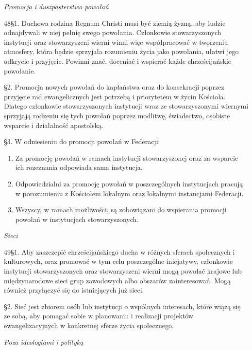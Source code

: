 ﻿\documentclass{book}
\newcommand{\lett}[1]{\lettrine[findent=6pt]{#1}}
\newcommand{\ssec}[1]{\vspace{1em}\textit{#1}\vspace{.5em}\nopagebreak}
\begin{document}
\ssec{Promocja i duszpasterstwo powołań}
 
\lett{48} \S{}1. Duchowa rodzina Regnum Christi musi być ziemią żyzną, aby ludzie odnajdywali w niej pełnię swego powołania. Członkowie stowarzyszonych instytucji oraz stowarzyszeni wierni winni więc współpracować w tworzeniu atmosfery, która będzie sprzyjała rozumieniu życia jako powołania, ułatwi jego odkrycie i przyjęcie. Powinni  znać, doceniać i wspierać każde chrześcijańskie powołanie.


\S{}2. Promocja nowych powołań do kapłaństwa oraz do konsekracji poprzez przyjęcie rad ewangelicznych jest potrzebą i priorytetem w życiu Kościoła. Dlatego członkowie stowarzyszonych instytucji wraz ze stowarzyszonymi wiernymi sprzyjają rodzeniu się tych powołań poprzez modlitwę, świadectwo, osobiste wsparcie i działalność apostolską.


\S{}3. W odniesieniu do promocji powołań w Federacji:


\begin{enumerate}


\item Za promocję powołań w ramach instytucji stowarzyszonej oraz za wsparcie ich rozeznania odpowiada sama instytucja.


\item Odpowiedzialni za promocję powołań w poszczególnych instytucjach pracują w porozumieniu z Kościołem lokalnym oraz lokalnymi instancjami Federacji.


\item Wszyscy, w ramach możliwości, są zobowiązani do wspierania promocji powołań w instytucjach stowarzyszonych.


\end{enumerate}


 
\ssec{Sieci}
 
\lett{49} \S{}1. Aby zaszczepić chrześcijańskiego ducha w różnych sferach społecznych i kulturowych, oraz promować w tym celu poszczególne inicjatywy, członkowie instytucji stowarzyszonych oraz stowarzyszeni wierni mogą powołać krajowe lub międzynarodowe sieci grup zawodowych albo obszarów zainteresowań. Mogą również przyłączyć się do istniejących już sieci.


\S{}2. Sieć jest zbiorem osób lub instytucji o wspólnych interesach, które wiążą się ze sobą, aby pomagać sobie w planowaniu i realizacji projektów ewangelizacyjnych w konkretnej sferze życia społecznego.
 
\ssec{Poza ideologiami i polityką}
 
\end{document}
